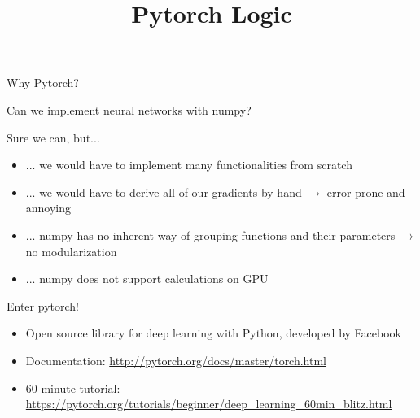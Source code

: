 





\newcommand{\titlefigure}{figure/python.png} %
\newcommand{\learninggoals}{
\item Understand how a tensor works
\item Understand how backpropagation works
\item Be able to write basic PyTorch code}

\renewcommand{\bfseries}{\mdseries}





\title{Pytorch Logic}
\date{}




\begin{vbframe}{Why Pytorch?}

\vfill

Can we implement neural networks with numpy?

Sure we can, but...
\vfill
 \begin{itemize}
 \item ... we would have to implement many functionalities from scratch
 \item ... we would have to derive all of our gradients by hand $\rightarrow$ error-prone and annoying
 \item ... numpy has no inherent way of grouping functions and their parameters $\rightarrow$ no modularization
 \item ... numpy does not support calculations on GPU
 \end{itemize}


\vfill

\end{vbframe}


\begin{vbframe}{Enter pytorch!}

	\vfill
	\begin{itemize}
	 \item Open source library for deep learning with Python, developed by Facebook
	 \item Documentation: \url{http://pytorch.org/docs/master/torch.html}
	 \item 60 minute tutorial: \url{https://pytorch.org/tutorials/beginner/deep_learning_60min_blitz.html}
	\end{itemize}
	

\vfill

\end{vbframe}

